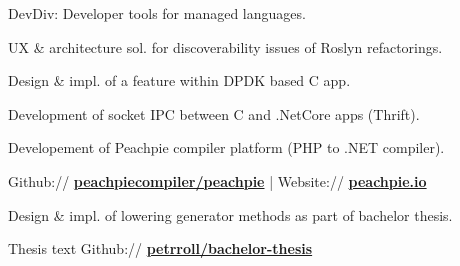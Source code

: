 \documentclass[a4paper]{deedy-resume} %
\begin{document}
\begin{minipage}[t]{0.62\textwidth}


\begin{tightitemize}
\item DevDiv: Developer tools for managed languages.
\item UX \& architecture sol. for discoverability issues of Roslyn refactorings.
\end{tightitemize}

\begin{tightitemize}
\item Design \& impl. of a feature within DPDK based C app.
\item Development of socket IPC between C and .NetCore apps (Thrift).
\end{tightitemize}

\halfsectionspace %



\begin{tightitemize}
\item Developement of Peachpie compiler platform (PHP to .NET compiler).
\item Github:// \href{https://github.com/peachpiecompiler/peachpie}{\bf peachpiecompiler/peachpie} | Website:// \href{https://www.peachpie.io/}{\bf peachpie.io}
\item Design \& impl. of lowering generator methods as part of bachelor thesis.
\item Thesis text Github:// \href{https://github.com/petrroll/bachelor-thesis}{\bf petrroll/bachelor-thesis}
\end{tightitemize}

\sectionspace %


%
%


\end{minipage}
\end{document}
